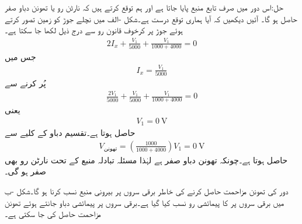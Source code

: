حل:اس دور میں صرف تابع منبع پایا جاتا ہے اور ہم توقع کرتے ہیں کہ نارٹن رو یا تھونن دباو صفر حاصل ہو گا۔ آئیں دیکھیں کہ آیا ہماری توقع درست ہے۔شکل -الف میں نچلے جوڑ کو زمین تصور کرتے  ہوئے جوڑ  پر کرخوف قانون رو سے درج ذیل لکھا جا سکتا ہے۔
\begin{align*}
2I_x+\frac{V_1}{5000}+\frac{V_1}{1000+4000}=0
\end{align*}
جس میں
\begin{align*}
I_x=\frac{V_1}{5000}
\end{align*}
پُر کرنے سے 
\begin{align*}
\frac{2 V_1}{5000}+\frac{V_1}{5000}+\frac{V_1}{1000+4000}=0
\end{align*}
یعنی
\begin{align*}
V_1=\SI{0}{\volt}
\end{align*}
حاصل ہوتا ہے۔تقسیم دباو کے کلیے سے 
\begin{align*}
V_{\text{تھونن}}=\left(\frac{1000}{1000+4000}\right) V_1=\SI{0}{\volt}
\end{align*}
حاصل ہوتا ہے۔چونکہ تھونن دباو صفر ہے لہٰذا مسئلہ تبادلہ منبع کے تحت نارٹن رو بھی صفر ہو گی۔


دور کی تھونن مزاحمت حاصل کرنے کی خاطر برقی سروں پر بیرونی منبع نسب کرنا ہو گا۔شکل -ب میں برقی سروں پر
  کا پیمائشی رو نسب کیا گیا ہے۔برقی سروں پر پیمائشی دباو  جانتے ہوئے  تھونن مزاحمت حاصل کی جا سکتی ہے۔

